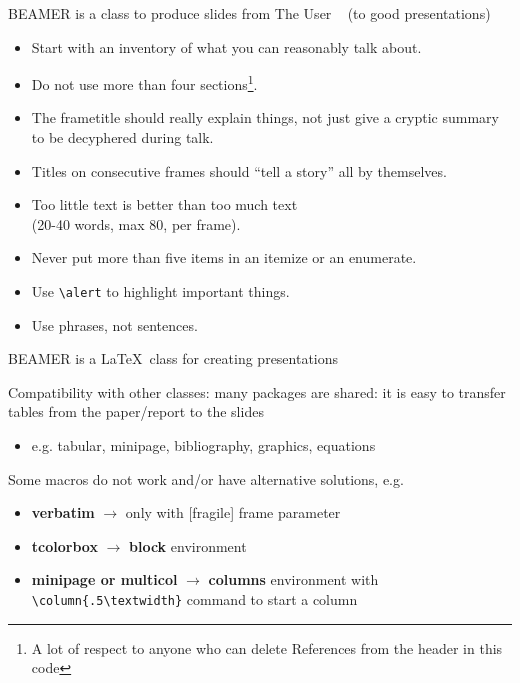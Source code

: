 \documentclass[11pt]{beamer} %
\begin{document}
\begin{frame}[fragile]{BEAMER is a class to produce slides}
 \alert{from The User \href{http://tug.ctan.org/macros/latex/contrib/beamer/doc/beameruserguide.pdf}{}~\cite{tantau2022} (to good presentations)}
	\begin{itemize}
		\item Start with an inventory of what you can reasonably talk about.
		\item Do not use more than four sections\footnote{\alert{A lot of respect to anyone who can delete References from the header in this code}}.
		
		\item The frametitle should really explain things, not just give a cryptic summary to be decyphered during talk.
		\item Titles on consecutive frames should ``tell a story'' all by themselves.
		\item Too little text is better than too much text 
		\\(20-40 words, max 80, per frame).
		\item Never put more than five items in an itemize or an enumerate.
		\item Use \verb|\alert| to highlight important things.
		\item Use phrases, not sentences.
	\end{itemize}
	
\end{frame}

\begin{frame}{}
	\begin{exampleblock}{BEAMER}
		is a \LaTeX~class for creating presentations
	\end{exampleblock}

	\begin{block}{Compatibility with other classes:}
		many packages are shared: it is easy to transfer tables from the paper/report to the slides
		\begin{itemize}
			\item e.g. tabular, minipage, bibliography, graphics, equations
		\end{itemize}
	 Some \alert{macros do not work} and/or have alternative solutions, e.g. 
		\begin{itemize}
			\item \textbf{verbatim} $\rightarrow$ only with [fragile] frame parameter
			\item \textbf{tcolorbox} $\rightarrow$ \textbf{block} environment
			\item \textbf{minipage or multicol} $\rightarrow$ \textbf{columns} environment with \verb|\column{.5\textwidth}| command to start a column
		\end{itemize}
	\end{block}
\end{frame}
\end{document}
